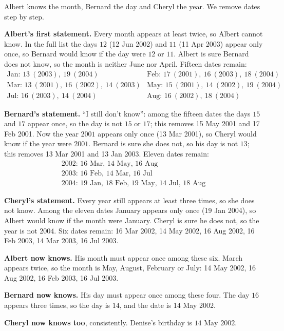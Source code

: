Albert knows the month, Bernard the day and Cheryl the year. We remove dates step by step.

\textbf{Albert's first statement.} Every month appears at least twice, so Albert cannot know. In the full list the days $12$ (12 Jun 2002) and $11$ (11 Apr 2003) appear only once, so Bernard would know if the day were $12$ or $11$. Albert is sure Bernard does not know, so the month is neither June nor April. Fifteen dates remain:
\[\begin{array}{ll}
\text{Jan: } 13\ (2003),\ 19\ (2004) & \text{Feb: } 17\ (2001),\ 16\ (2003),\ 18\ (2004)\\
\text{Mar: } 13\ (2001),\ 16\ (2002),\ 14\ (2003) & \text{May: } 15\ (2001),\ 14\ (2002),\ 19\ (2004)\\
\text{Jul: } 16\ (2003),\ 14\ (2004) & \text{Aug: } 16\ (2002),\ 18\ (2004)
\end{array}\]

\textbf{Bernard's statement.} ``I still don't know'': among the fifteen dates the days $15$ and $17$ appear once, so the day is not $15$ or $17$; this removes 15 May 2001 and 17 Feb 2001. Now the year $2001$ appears only once (13 Mar 2001), so Cheryl would know if the year were $2001$. Bernard is sure she does not, so his day is not $13$; this removes 13 Mar 2001 and 13 Jan 2003. Eleven dates remain:
\[\begin{array}{l}
2002\text{: 16 Mar, 14 May, 16 Aug}\\
2003\text{: 16 Feb, 14 Mar, 16 Jul}\\
2004\text{: 19 Jan, 18 Feb, 19 May, 14 Jul, 18 Aug}
\end{array}\]

\textbf{Cheryl's statement.} Every year still appears at least three times, so she does not know. Among the eleven dates January appears only once (19 Jan 2004), so Albert would know if the month were January. Cheryl is sure he does not, so the year is not $2004$. Six dates remain: 16 Mar 2002, 14 May 2002, 16 Aug 2002, 16 Feb 2003, 14 Mar 2003, 16 Jul 2003.

\textbf{Albert now knows.} His month must appear once among these six. March appears twice, so the month is May, August, February or July: 14 May 2002, 16 Aug 2002, 16 Feb 2003, 16 Jul 2003.

\textbf{Bernard now knows.} His day must appear once among these four. The day $16$ appears three times, so the day is $14$, and the date is 14 May 2002.

\textbf{Cheryl now knows too}, consistently. Denise's birthday is $\boxed{\text{14 May 2002}}$.
